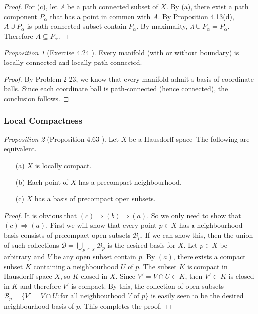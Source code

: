 \documentclass[a4paper]{article}
\theoremstyle{remark}
\newtheorem{prop}{Proposition}
\newcommand{\subhim}{\subseteq} %
\begin{document}
\begin{proof}
	For (c), let $A$ be a path connected subset of $X$. By (a), there exist a path component $P_{\alpha}$ that has a point in common with $A$. By Proposition 4.13(d), $A \cup P_{\alpha}$ is path connected subset contain $P_{\alpha}$. By maximality, $A \cup P_{\alpha} = P_{\alpha}$. Therefore $A \subhim P_{\alpha}$.
\end{proof}

\begin{prop}[Exercise 4.24 \cite{LeeTM}]
	Every manifold (with or without boundary) is locally connected and locally path-connected.
\end{prop}
\begin{proof}
	By Problem 2-23, we know that every manifold admit a basis of coordinate balls. Since each coordinate ball is path-connected (hence connected), the conclusion follows.
\end{proof}

\subsubsection*{Local Compactness}
\begin{prop}[Proposition 4.63 \cite{LeeTM}]
Let $X$ be a Hausdorff space. The following are equivalent.
\begin{enumerate}[nolistsep]
	\item[(a)] $X$ is locally compact.
	\item[(b)]  Each point of $X$ has a precompact neighbourhood.
	\item[(c)]  $X$ has a basis of precompact open subsets.
\end{enumerate}	
\end{prop}

\begin{proof}
	It is  obvious that $(c) \Rightarrow (b)\Rightarrow (a)$. So we only need to show that $(c) \Rightarrow (a)$. First we will show that every point $p \in X$ has a neighbourhood basis consists of precompact open subsets $\mathcal{B}_p$. If we can show this, then the union of such collections $\mathcal{B} =\bigcup_{p \in X} \mathcal{B}_p$ is the desired basis for $X$. Let $p \in X$ be arbitrary and $V$ be any open subset contain $p$. By $(a)$, there exists a compact subset $K$ containing a neighbourhood $U$ of $p$. The subset $K$ is compact in Hausdorff space $X$, so $K$ closed in $X$. Since $V' = V \cap U \subset K$, then $\overline{V'} \subset K$ is closed in $K$ and therefore $\overline{V'}$ is compact. By this, the collection of open subsets $\mathcal{B}_p = \{ V' = V \cap U : \text{for all neighbourhood } V \text{ of }p \}$ is easily seen to be the desired neighbourhood basis of $p$. This completes the proof. 
\end{proof}
\end{document}
